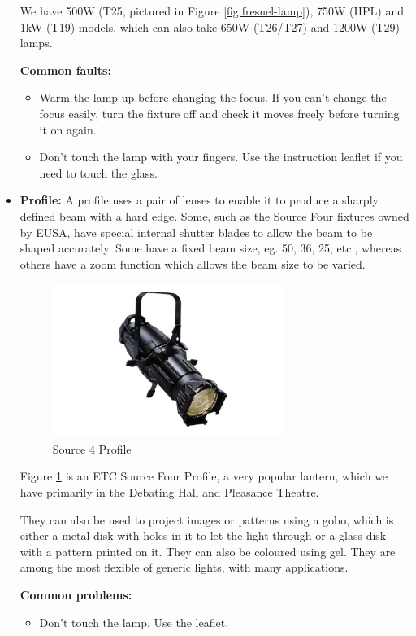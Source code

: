 \documentclass[14pt]{article} %
\begin{document}
\begin{itemize}
\begin{figure}[h]
\begin{center}
\end{center}
\end{figure}

We have 500W (T25, pictured in Figure \ref{fig:fresnel-lamp}), 750W (HPL) and 1kW (T19) models, which can also take 650W (T26/T27) and 1200W (T29) lamps.

\textbf{Common faults:}
\begin{itemize}
\item Warm the lamp up before changing the focus. If you can’t change the focus easily, turn the fixture off and check it moves freely before turning it on again.
\item Don’t touch the lamp with your fingers. Use the instruction leaflet if you need to touch the glass.
\end{itemize}

\item \textbf{Profile: }
A profile uses a pair of lenses to enable it to produce a sharply defined beam with a hard edge. Some, such as the Source Four fixtures owned by EUSA, have special internal shutter blades to allow the beam to be shaped accurately. Some have a fixed beam size, eg. 50\textdegree, 36\textdegree, 25\textdegree, etc., whereas others have a zoom function which allows the beam size to be varied. 

\begin{figure}[h]
\begin{center}

\includegraphics[height=5cm]{source4.jpg}
\caption{Source 4 Profile}
\label{fig:profile}

\end{center}
\end{figure}

Figure \ref{fig:profile} is an ETC Source Four Profile, a very popular lantern, which we have primarily in the Debating Hall and Pleasance Theatre.

They can also be used to project images or patterns using a gobo, which is either a metal disk with holes in it to let the light through or a glass disk with a pattern printed on it. They can also be coloured using gel. They are among the most flexible of generic lights, with many applications. 

\textbf{Common problems:}
\begin{itemize}
\item Don't touch the lamp. Use the leaflet.
\end{itemize}

\end{itemize}
\end{document}
